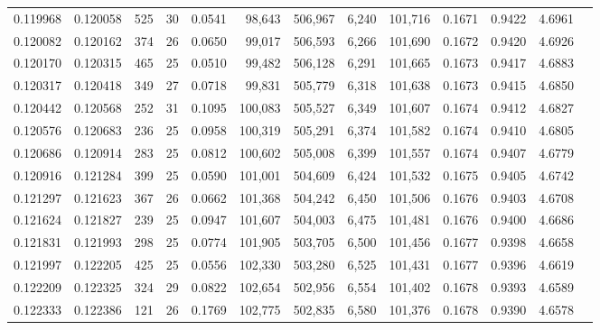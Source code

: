 \begin{tabular}{rrrrrrrrrrrrr}
0.119968 & 0.120058 &   525 &  30 &                                     0.0541 &  98,643 & 506,967 &   6,240 & 101,716 & 0.1671 & 0.9422 & 4.6961 \\
0.120082 & 0.120162 &   374 &  26 &                                     0.0650 &  99,017 & 506,593 &   6,266 & 101,690 & 0.1672 & 0.9420 & 4.6926 \\
0.120170 & 0.120315 &   465 &  25 &                                     0.0510 &  99,482 & 506,128 &   6,291 & 101,665 & 0.1673 & 0.9417 & 4.6883 \\
0.120317 & 0.120418 &   349 &  27 &                                     0.0718 &  99,831 & 505,779 &   6,318 & 101,638 & 0.1673 & 0.9415 & 4.6850 \\
0.120442 & 0.120568 &   252 &  31 &                                     0.1095 & 100,083 & 505,527 &   6,349 & 101,607 & 0.1674 & 0.9412 & 4.6827 \\
0.120576 & 0.120683 &   236 &  25 &                                     0.0958 & 100,319 & 505,291 &   6,374 & 101,582 & 0.1674 & 0.9410 & 4.6805 \\
0.120686 & 0.120914 &   283 &  25 &                                     0.0812 & 100,602 & 505,008 &   6,399 & 101,557 & 0.1674 & 0.9407 & 4.6779 \\
0.120916 & 0.121284 &   399 &  25 &                                     0.0590 & 101,001 & 504,609 &   6,424 & 101,532 & 0.1675 & 0.9405 & 4.6742 \\
0.121297 & 0.121623 &   367 &  26 &                                     0.0662 & 101,368 & 504,242 &   6,450 & 101,506 & 0.1676 & 0.9403 & 4.6708 \\
0.121624 & 0.121827 &   239 &  25 &                                     0.0947 & 101,607 & 504,003 &   6,475 & 101,481 & 0.1676 & 0.9400 & 4.6686 \\
0.121831 & 0.121993 &   298 &  25 &                                     0.0774 & 101,905 & 503,705 &   6,500 & 101,456 & 0.1677 & 0.9398 & 4.6658 \\
0.121997 & 0.122205 &   425 &  25 &                                     0.0556 & 102,330 & 503,280 &   6,525 & 101,431 & 0.1677 & 0.9396 & 4.6619 \\
0.122209 & 0.122325 &   324 &  29 &                                     0.0822 & 102,654 & 502,956 &   6,554 & 101,402 & 0.1678 & 0.9393 & 4.6589 \\
0.122333 & 0.122386 &   121 &  26 &                                     0.1769 & 102,775 & 502,835 &   6,580 & 101,376 & 0.1678 & 0.9390 & 4.6578 \\

\end{tabular}
